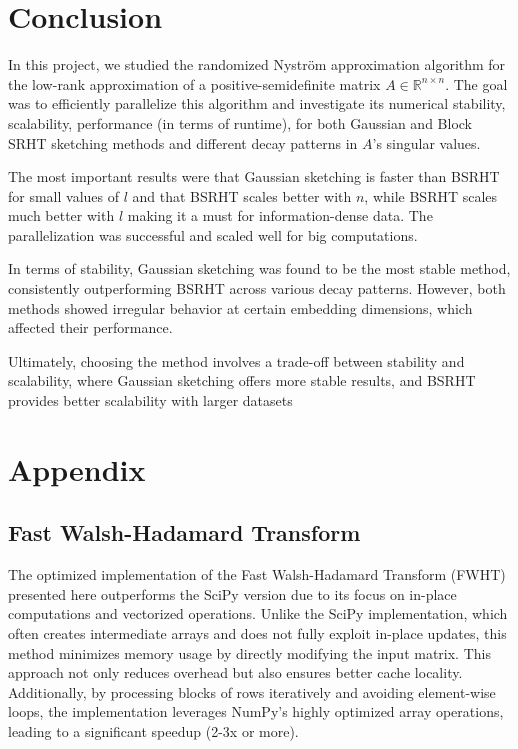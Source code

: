 \documentclass[a4paper, 12pt,oneside]{article}
\begin{document}
	\section{Conclusion}
	In this project, we studied the randomized Nystr\"om approximation algorithm for the low-rank approximation of a positive-semidefinite matrix $A \in \mathbb{R}^{n \times n}$. The goal was to efficiently parallelize this algorithm and investigate its numerical stability, scalability, performance (in terms of runtime), for both Gaussian and Block SRHT sketching methods and different decay patterns in $A$'s singular values. 

	
	The most important results were that Gaussian sketching is faster than BSRHT for small values of $l$ and that BSRHT scales better with $n$, while BSRHT scales much better with $l$ making it a must for information-dense data. The parallelization was successful and scaled well for big computations. 
	
	In terms of stability, Gaussian sketching was found to be the most stable method, consistently outperforming BSRHT across various decay patterns. However, both methods showed irregular behavior at certain embedding dimensions, which affected their performance. 
	
	Ultimately, choosing the method involves a trade-off between stability and scalability, where Gaussian sketching offers more stable results, and BSRHT provides better scalability with larger datasets
\newpage
	\section{Appendix}
	\subsection{Fast Walsh-Hadamard Transform}
	The optimized implementation of the Fast Walsh-Hadamard Transform (FWHT) presented here outperforms the SciPy version due to its focus on in-place computations and vectorized operations. Unlike the SciPy implementation, which often creates intermediate arrays and does not fully exploit in-place updates, this method minimizes memory usage by directly modifying the input matrix. This approach not only reduces overhead but also ensures better cache locality. Additionally, by processing blocks of rows iteratively and avoiding element-wise loops, the implementation leverages NumPy's highly optimized array operations, leading to a significant speedup (2-3x or more). 
\end{document}
